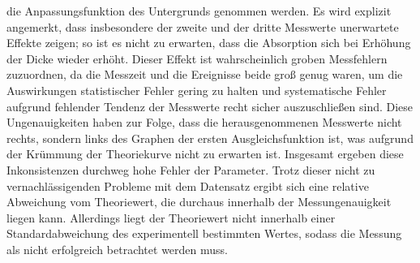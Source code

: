 die Anpassungsfunktion des Untergrunds genommen werden. Es wird explizit angemerkt, dass insbesondere
der zweite und der dritte Messwerte unerwartete Effekte zeigen; so ist es nicht zu erwarten, dass
die Absorption sich bei Erhöhung der Dicke wieder erhöht. Dieser Effekt ist wahrscheinlich groben
Messfehlern zuzuordnen, da die Messzeit und die Ereignisse beide groß genug waren, um die Auswirkungen
statistischer Fehler gering zu halten und systematische Fehler aufgrund fehlender Tendenz der Messwerte
recht sicher auszuschließen sind. Diese Ungenauigkeiten haben zur Folge, dass die herausgenommenen Messwerte
nicht rechts, sondern links des Graphen der ersten Ausgleichsfunktion ist, was aufgrund der Krümmung
der Theoriekurve nicht zu erwarten ist. Insgesamt ergeben diese Inkonsistenzen durchweg hohe
Fehler der Parameter. Trotz dieser nicht zu vernachlässigenden Probleme mit dem Datensatz
ergibt sich eine relative Abweichung vom Theoriewert, die durchaus innerhalb der Messungenauigkeit liegen kann. Allerdings
liegt der Theoriewert nicht innerhalb einer Standardabweichung des experimentell bestimmten
Wertes, sodass die Messung als nicht erfolgreich betrachtet werden muss.
